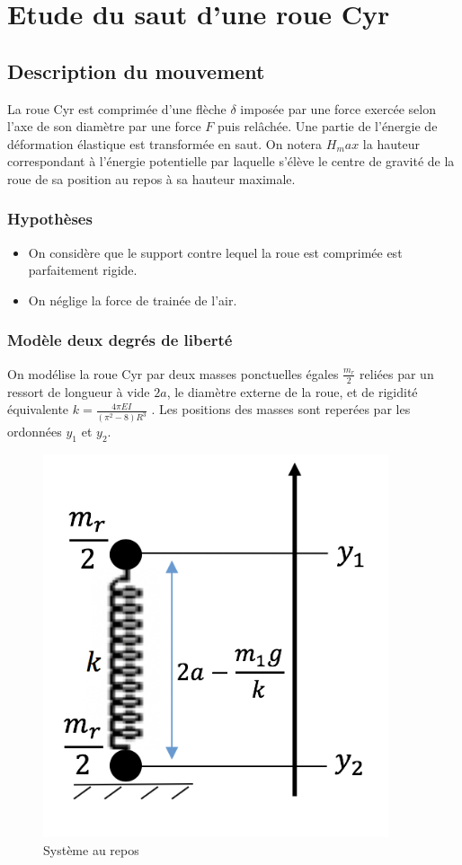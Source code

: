 \section{Etude du saut d'une roue Cyr}
\subsection{Description du mouvement}
La roue Cyr est comprimée d'une flèche $\delta$ imposée par une force exercée selon l'axe de son diamètre par une force $F$ puis relâchée. Une partie de l'énergie de déformation élastique est transformée en saut. On notera $H_max$ la hauteur correspondant à l'énergie potentielle par laquelle s'élève le centre de gravité de la roue de sa position au repos à sa hauteur maximale.


\subsubsection{Hypothèses}
\begin{itemize}
    \item On considère que le support contre lequel la roue est comprimée est parfaitement rigide.
    \item On néglige la force de trainée de l'air.
\end{itemize}

\subsubsection{Modèle deux degrés de liberté}
On modélise la roue Cyr par deux masses ponctuelles égales $\frac{m_r}{2}$ reliées par un ressort de longueur à vide $2a$, le diamètre externe de la roue, et de rigidité équivalente $k=\frac{4\pi EI}{(\pi^2 -8)R^3}$ \cite{yangkim}. Les positions des masses sont reperées par les ordonnées $y_1$ et $y_2$.

\begin{figure}[htb]
\centering
\includegraphics[width=4in]{images_2ddl/repos.png}
\caption{Système au repos}
\label{fig:repos}
\end{figure}

